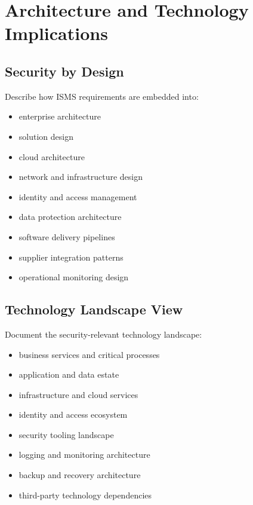 \documentclass[
  letterpaper,
  DIV=11,
  numbers=noendperiod]{scrartcl}
\providecommand{\tightlist}{%
  \setlength{\itemsep}{0pt}\setlength{\parskip}{0pt}}
\begin{document}
\section{Architecture and Technology
Implications}\label{architecture-and-technology-implications}

\subsection{Security by Design}\label{security-by-design}

Describe how ISMS requirements are embedded into:

\begin{itemize}
\tightlist
\item
  enterprise architecture
\item
  solution design
\item
  cloud architecture
\item
  network and infrastructure design
\item
  identity and access management
\item
  data protection architecture
\item
  software delivery pipelines
\item
  supplier integration patterns
\item
  operational monitoring design
\end{itemize}

\subsection{Technology Landscape View}\label{technology-landscape-view}

Document the security-relevant technology landscape:

\begin{itemize}
\tightlist
\item
  business services and critical processes
\item
  application and data estate
\item
  infrastructure and cloud services
\item
  identity and access ecosystem
\item
  security tooling landscape
\item
  logging and monitoring architecture
\item
  backup and recovery architecture
\item
  third-party technology dependencies
\end{itemize}
\end{document}

